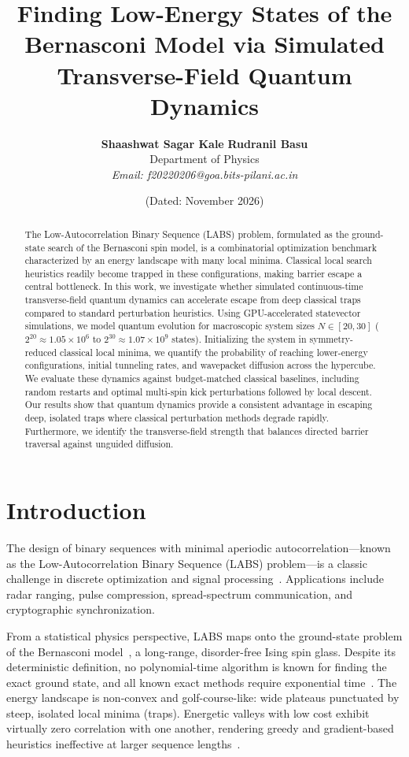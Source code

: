 \documentclass[10pt,twocolumn,a4paper]{article}
\title{\textbf{\LARGE Finding Low-Energy States of the Bernasconi Model via Simulated Transverse-Field Quantum Dynamics}}
\author{
    \textbf{Shaashwat Sagar Kale} \quad 
    \textbf{Rudranil Basu}\\[0.3em]
    \small Department of Physics\\[-0.2em]
    \small \textit{Email: f20220206@goa.bits-pilani.ac.in}
}
\date{\small (Dated: November 2026)}
\begin{document}
\maketitle

\begin{abstract}
The Low-Autocorrelation Binary Sequence (LABS) problem, formulated as the ground-state search of the Bernasconi spin model, is a combinatorial optimization benchmark characterized by an energy landscape with many local minima. Classical local search heuristics readily become trapped in these configurations, making barrier escape a central bottleneck. In this work, we investigate whether simulated continuous-time transverse-field quantum dynamics can accelerate escape from deep classical traps compared to standard perturbation heuristics. Using GPU-accelerated statevector simulations, we model quantum evolution for macroscopic system sizes $N \in [20, 30]$ ($2^{20} \approx 1.05 \times 10^6$ to $2^{30} \approx 1.07 \times 10^9$ states). Initializing the system in symmetry-reduced classical local minima, we quantify the probability of reaching lower-energy configurations, initial tunneling rates, and wavepacket diffusion across the hypercube. We evaluate these dynamics against budget-matched classical baselines, including random restarts and optimal multi-spin kick perturbations followed by local descent. Our results show that quantum dynamics provide a consistent advantage in escaping deep, isolated traps where classical perturbation methods degrade rapidly. Furthermore, we identify the transverse-field strength that balances directed barrier traversal against unguided diffusion.
\end{abstract}

\section{Introduction}
\label{sec:intro}
The design of binary sequences with minimal aperiodic autocorrelation---known as the Low-Autocorrelation Binary Sequence (LABS) problem---is a classic challenge in discrete optimization and signal processing~\cite{bernasconi1987, packebusch2016}. Applications include radar ranging, pulse compression, spread-spectrum communication, and cryptographic synchronization. 

From a statistical physics perspective, LABS maps onto the ground-state problem of the Bernasconi model~\cite{mertens1998}, a long-range, disorder-free Ising spin glass. Despite its deterministic definition, no polynomial-time algorithm is known for finding the exact ground state, and all known exact methods require exponential time~\cite{packebusch2016}. The energy landscape is non-convex and golf-course-like: wide plateaus punctuated by steep, isolated local minima (traps). Energetic valleys with low cost exhibit virtually zero correlation with one another, rendering greedy and gradient-based heuristics ineffective at larger sequence lengths~\cite{mertens1996, prestwich2007}.
\end{document}
